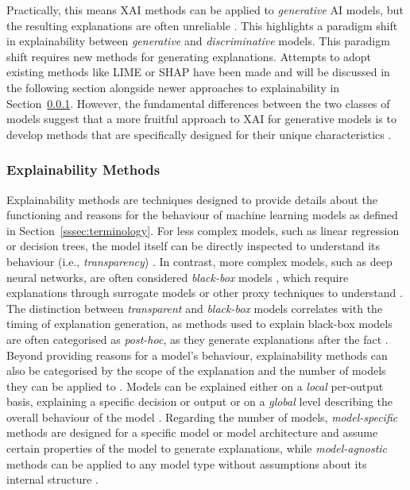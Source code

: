 Practically, this means \ac{XAI} methods can be applied to \textit{generative} \ac{AI} models, but the resulting explanations are often unreliable \parencite{Kumarage2026}. This highlights a paradigm shift in explainability between \textit{generative} and \textit{discriminative} models. This paradigm shift requires new methods for generating explanations. Attempts to adopt existing methods like \acs{LIME} or \acs{SHAP} have been made and will be discussed in the following section alongside newer approaches to explainability in Section~\ref{sssec:xai-methods}. However, the fundamental differences between the two classes of models suggest that a more fruitful approach to \ac{XAI} for generative models is to develop methods that are specifically designed for their unique characteristics \parencite{Schneider2024}.

\subsubsection{Explainability Methods} \label{sssec:xai-methods}

Explainability methods are techniques designed to provide details about the functioning and reasons for the behaviour of machine learning models as defined in Section~\ref{sssec:terminology}. For less complex models, such as linear regression or decision trees, the model itself can be directly inspected to understand its behaviour (i.e., \textit{transparency}) \parencite{Molnar2025}. In contrast, more complex models, such as deep neural networks, are often considered \textit{black-box} models \parencite{Lipton2018}, which require explanations through surrogate models or other proxy techniques to understand \parencite{Retzlaff2024}. The distinction between \textit{transparent} and \textit{black-box} models correlates with the timing of explanation generation, as methods used to explain black-box models are often categorised as \textit{post-hoc}, as they generate explanations after the fact \parencite{Retzlaff2024}. Beyond providing reasons for a model's behaviour, explainability methods can also be categorised by the scope of the explanation and the number of models they can be applied to \parencite{Ali2023}. Models can be explained either on a \textit{local} per-output basis, explaining a specific decision or output or on a \textit{global} level describing the overall behaviour of the model \parencite{Rai2020,Ali2023}.  Regarding the number of models, \textit{model-specific} methods are designed for a specific model or model architecture and assume certain properties of the model to generate explanations, while \textit{model-agnostic} methods can be applied to any model type without assumptions about its internal structure \parencite{Ali2023}.

